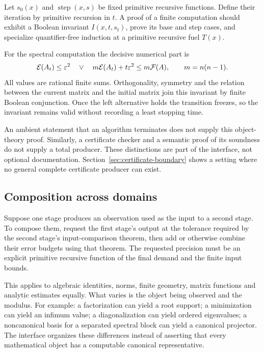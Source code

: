 Let $s_0(x)$ and $\operatorname{step}(x,s)$ be fixed primitive recursive functions. Define their iteration by primitive recursion in $t$. A proof of a finite computation should exhibit a Boolean invariant $I(x,t,s_t)$, prove its base and step cases, and specialize quantifier-free induction at a primitive recursive fuel $T(x)$.

For the spectral computation the decisive numerical part is
\[
 \mathcal E(A_t)\le\varepsilon^2
 \quad\lor\quad
 m\mathcal E(A_t)+t\varepsilon^2\le m\mathcal F(A),
 \qquad m=n(n-1).
\]
All values are rational finite sums. Orthogonality, symmetry and the relation between the current matrix and the initial matrix join this invariant by finite Boolean conjunction. Once the left alternative holds the transition freezes, so the invariant remains valid without recording a least stopping time.

An ambient statement that an algorithm terminates does not supply this object-theory proof. Similarly, a certificate checker and a semantic proof of its soundness do not supply a total producer. These distinctions are part of the interface, not optional documentation. Section~\ref{sec:certificate-boundary} shows a setting where no general complete certificate producer can exist.

\subsection{Composition across domains}

Suppose one stage produces an observation used as the input to a second stage. To compose them, request the first stage's output at the tolerance required by the second stage's input-comparison theorem, then add or otherwise combine their error budgets using that theorem. The requested precision must be an explicit primitive recursive function of the final demand and the finite input bounds.

This applies to algebraic identities, norms, finite geometry, matrix functions and analytic estimates equally. What varies is the object being observed and the modulus. For example: a factorization can yield a root support; a minimization can yield an infimum value; a diagonalization can yield ordered eigenvalues; a noncanonical basis for a separated spectral block can yield a canonical projector. The interface organizes these differences instead of asserting that every mathematical object has a computable canonical representative.
